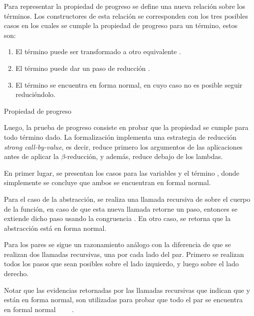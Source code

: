 Para representar la propiedad de progreso se define una nueva relación  sobre los términos.
Los constructores de esta relación se corresponden con los tres posibles casos en los cuales se cumple la propiedad de progreso para un término, estos son:
\begin{enumerate}
	\item El término puede ser transformado a otro equivalente \type{$\_\rightleftarrows\_$}.
	\item El término puede dar un paso de reducción \type{$\_\hookrightarrow\_$}.
	\item El término se encuentra en forma normal, en cuyo caso no es posible seguir reduciéndolo.
\end{enumerate}

\begin{codigo}
	Propiedad de progreso
\end{codigo}

Luego, la prueba de progreso consiste en probar que la propiedad  se cumple para todo término dado.
La formalización implementa una estrategia de reducción \textit{strong call-by-value}, es decir, reduce primero los argumentos de las aplicaciones antes de aplicar la $\beta$-reducción, y además, reduce debajo de los lambdas.

En primer lugar, se presentan los casos para las variables y el término \const{$\star$}, donde simplemente se concluye que ambos se encuentran en formal normal.


Para el caso de la abstracción, se realiza una llamada recursiva de  sobre el cuerpo de la función, en caso de que esta nueva llamada retorne un paso, entonces se extiende dicho paso usando la congruencia \const{$\zeta$}.
En otro caso, se retorna que la abstracción está en forma normal.


Para los pares se sigue un razonamiento análogo con la diferencia de que se realizan dos llamadas recursivas, una por cada lado del par.
Primero se realizan todos los pasos que sean posibles sobre el lado izquierdo, y luego sobre el lado derecho.


Notar que las evidencias retornadas por las llamadas recursivas que indican que  y  están en forma normal, son utilizadas para probar que todo el par se encuentra en formal normal ~~\const{,}~~\const{$\rangle$}.

